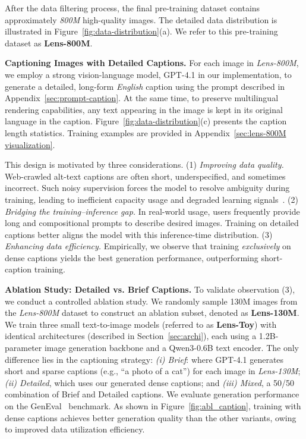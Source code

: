 \documentclass{llmxive}
\begin{document}
After the data filtering process, the final pre-training dataset contains approximately \textit{800M} high-quality images. The detailed data distribution is illustrated in Figure~\ref{fig:data-distribution}(a). We refer to this pre-training dataset as \textbf{Lens-800M}.








\noindent\textbf{Captioning Images with Detailed Captions.}
For each image in \textit{Lens-800M}, we employ a strong vision-language model, GPT-4.1 in our implementation, to generate a detailed, long-form \textit{English} caption using the prompt described in Appendix~\ref{sec:prompt-caption}. At the same time, to preserve multilingual rendering capabilities, any text appearing in the image is kept in its original language in the caption. Figure~\ref{fig:data-distribution}(c) presents the caption length statistics. Training examples are provided in Appendix~\ref{sec:lens-800M visualization}.




This design is motivated by three considerations.
(1) \textit{Improving data quality.} Web-crawled alt-text captions are often short, underspecified, and sometimes incorrect. Such noisy supervision forces the model to resolve ambiguity during training, leading to inefficient capacity usage and degraded learning signals~\citep{betker2023improving,chen2024sharegpt4v}.
(2) \textit{Bridging the training–inference gap.} In real-world usage, users frequently provide long and compositional prompts to describe desired images. Training on detailed captions better aligns the model with this inference-time distribution.
(3) \textit{Enhancing data efficiency.} Empirically, we observe that training \emph{exclusively} on dense captions yields the best generation performance, outperforming short-caption training.

\noindent\textbf{Ablation Study: Detailed vs. Brief Captions.}
To validate observation (3), we conduct a controlled ablation study. We randomly sample 130M images from the \textit{Lens-800M} dataset to construct an ablation subset, denoted as \textbf{Lens-130M}. We train three small text-to-image models (referred to as \textbf{Lens-Toy}) with identical architectures (described in Section~\ref{sec:archi}), each using a 1.2B-parameter image generation backbone and a Qwen3-0.6B text encoder. The only difference lies in the captioning strategy:
\textit{(i) Brief}: where GPT-4.1 generates short and sparse captions (e.g., ``a photo of a cat'') for each image in \textit{Lens-130M};
\textit{(ii) Detailed}, which uses our generated dense captions; and \textit{(iii) Mixed}, a 50/50 combination of Brief and Detailed captions. We evaluate generation performance on the GenEval~\citep{ghosh2023geneval} benchmark. As shown in Figure~\ref{fig:abl_caption}, training with dense captions achieves better generation quality than the other variants, owing to improved data utilization efficiency.
 
\end{document}
